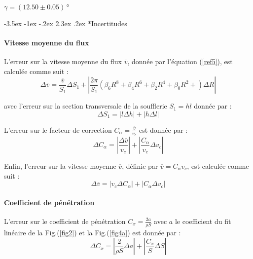 \documentclass[a4paper, 12pt,oneside]{article}
\makeatletter
\renewcommand{\subsection}{\@startsection {subsection}{1}{\z@}%
             {-3.5ex \@plus -1ex \@minus -.2ex}%
             {2.3ex \@plus.2ex}%
             {\normalfont\normalsize\bfseries}}
\makeatother
\begin{document}
$\gamma=(12.50\pm0.05)$\,°

\subsection*{Incertitudes}
\paragraph{Vitesse moyenne du flux}

L'erreur sur la vitesse moyenne du flux $\overline{v}$, donnée par l'équation (\ref{ref5}), est calculée comme suit :
\begin{equation}
    \Delta \overline{v} = \frac{\overline{v}}{S_1} \Delta S_1 + \left| \frac{2\pi}{S_1} \left(\beta_6 R^8 + \beta_4 R^6 +\beta_2 R^4 +\beta_0 R^2 +\right) \Delta R \right|
\end{equation}

\noindent avec l'erreur sur la section transversale de la soufflerie $S_1 = h l$ donnée par :
\begin{equation}
    \Delta S_1 = |l \Delta h| + |h \Delta l|
\end{equation}

L'erreur sur le facteur de correction $C_\alpha = \frac{\overline{v}}{v_c}$ est donnée par :
\begin{equation}
    \Delta C_\alpha = \left| \frac{\Delta \overline{v}}{v_c} \right| + \left| \frac{C_\alpha}{v_c} \Delta v_c \right|
\end{equation}

Enfin, l'erreur sur la vitesse moyenne $\overline{v}$, définie par $\overline{v} = C_\alpha v_c$, est calculée comme suit :
\begin{equation}
    \Delta \overline{v} = \left| v_c \Delta C_\alpha \right| + \left| C_\alpha \Delta v_c \right|
\end{equation}

\paragraph{Coefficient de pénétration}

L'erreur sur le coefficient de pénétration $C_x = \frac{2a}{\rho S}$ avec $a$ le coefficient du fit linéaire de la Fig.(\ref{fig2}) et la Fig.(\ref{fig4a}) est donnée par :
\begin{equation}
    \Delta C_x = \left| \frac{2}{\rho S} \Delta a \right| + \left| \frac{C_x}{S} \Delta S \right|
\end{equation}
\end{document}
